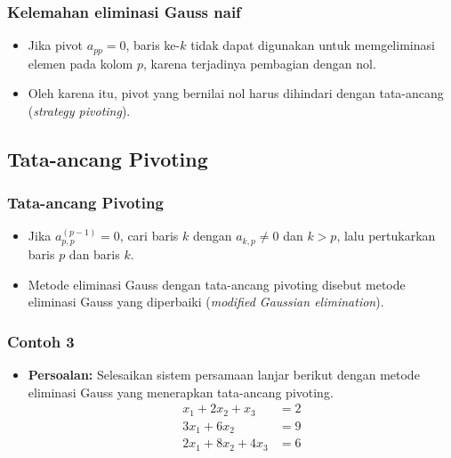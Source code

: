 \documentclass[pdflatex,compress,mathserif]{beamer}
\begin{document}
\begin{frame}
	\frametitle{Kelemahan eliminasi Gauss naif}
	\begin{itemize}
		\item Jika pivot $ a_{pp} = 0 $, baris ke-$ k $ tidak dapat digunakan untuk memgeliminasi elemen pada kolom $ p $, karena terjadinya pembagian dengan nol.
		\item Oleh karena itu, pivot yang bernilai nol harus dihindari dengan tata-ancang (\textit{strategy pivoting}).
	\end{itemize}
\end{frame}

\subsection{Tata-ancang Pivoting}

\begin{frame}
	\frametitle{Tata-ancang Pivoting}
	\begin{itemize}
		\item Jika $ a_{p,p}^{(p-1)} = 0 $, cari baris $ k $ dengan $ a_{k,p} \neq 0 $ dan $ k > p $, lalu pertukarkan baris $ p $ dan baris $ k $.
		\item Metode eliminasi Gauss dengan tata-ancang pivoting disebut metode eliminasi Gauss yang diperbaiki (\textit{modified Gaussian elimination}).
	\end{itemize}
\end{frame}

\begin{frame}
	\frametitle{Contoh 3}
	\begin{itemize}
		\item \textbf{Persoalan:} Selesaikan sistem persamaan lanjar berikut dengan metode eliminasi Gauss yang menerapkan tata-ancang pivoting.
		\begin{align*}
			x_1 + 2x_2 + x_3 &= 2 \\
			3x_1 + 6x_2 &= 9 \\
			2x_1 + 8x_2 + 4x_3 &= 6
		\end{align*}
	\end{itemize}
\end{frame}
\end{document}
